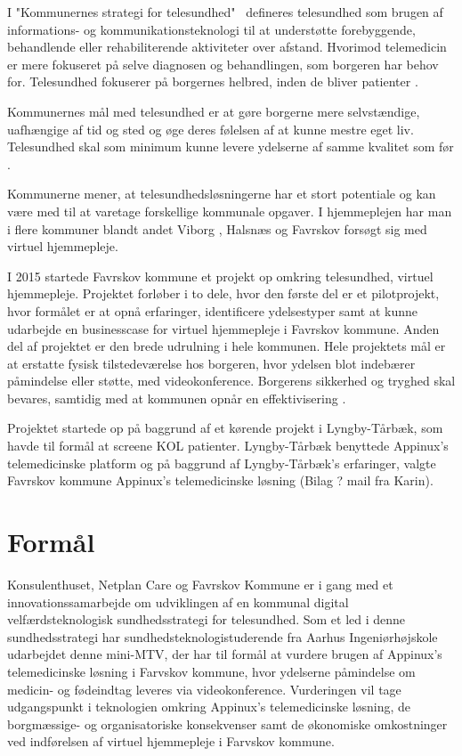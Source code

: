 I "Kommunernes strategi for telesundhed"\ \parencite{KLs} defineres telesundhed som brugen af informations- og kommunikationsteknologi til at understøtte forebyggende, behandlende eller rehabiliterende aktiviteter over afstand. Hvorimod telemedicin er mere fokuseret på selve diagnosen og behandlingen, som borgeren har behov for. Telesundhed fokuserer på borgernes helbred, inden de bliver patienter \parencite{KLs} \parencite{sundhed}.

Kommunernes mål med telesundhed er at gøre borgerne mere selvstændige, uafhængige af tid og sted og øge deres følelsen af at kunne mestre eget liv. Telesundhed skal som minimum kunne levere ydelserne af samme kvalitet som før \parencite{KLs}.

Kommunerne mener, at telesundhedsløsningerne har et stort potentiale og kan være med til at varetage forskellige kommunale opgaver. I hjemmeplejen har man i flere kommuner blandt andet Viborg \parencite{viborg}, Halsnæs \parencite{hals} og Favrskov forsøgt sig med virtuel hjemmepleje. 

I 2015 startede Favrskov kommune et projekt op omkring telesundhed, virtuel hjemmepleje. Projektet forløber i to dele, hvor den første del er et pilotprojekt, hvor formålet er at opnå erfaringer, identificere ydelsestyper samt at kunne udarbejde en businesscase for virtuel hjemmepleje i Favrskov kommune. Anden del af projektet er den brede udrulning i hele kommunen. Hele projektets mål er at erstatte fysisk tilstedeværelse hos borgeren, hvor ydelsen blot indebærer påmindelse eller støtte, med videokonference. Borgerens sikkerhed og tryghed skal bevares, samtidig med at kommunen opnår en effektivisering \parencite{projektplan}. 

Projektet startede op på baggrund af et kørende projekt i Lyngby-Tårbæk, som havde til formål at screene KOL patienter. Lyngby-Tårbæk benyttede Appinux's telemedicinske platform og på baggrund af Lyngby-Tårbæk's erfaringer, valgte Favrskov kommune Appinux's telemedicinske løsning (Bilag ? mail fra Karin).  

\section{Formål}
Konsulenthuset, Netplan Care og Favrskov Kommune er i gang med et innovationssamarbejde om udviklingen af en kommunal digital velfærdsteknologisk sundhedsstrategi for telesundhed. Som et led i denne sundhedsstrategi har sundhedsteknologistuderende fra Aarhus Ingeniørhøjskole udarbejdet denne mini-MTV, der har til formål at vurdere brugen af Appinux's telemedicinske løsning i Farvskov kommune, hvor ydelserne påmindelse om medicin- og fødeindtag leveres via videokonference. Vurderingen vil tage udgangspunkt i teknologien omkring Appinux's telemedicinske løsning, de borgmæssige- og organisatoriske konsekvenser samt de økonomiske omkostninger ved indførelsen af virtuel hjemmepleje i Farvskov kommune.  

